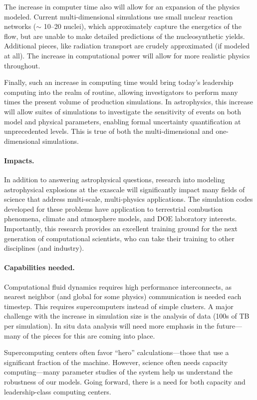 \documentclass[11pt,twocolumn]{article}
\begin{document}
The increase in computer time also will allow for an expansion of the
physics modeled.  Current multi-dimensional simulations use small
nuclear reaction networks ($\sim$ 10--20 nuclei), which approximately
capture the energetics of the flow, but are unable to make detailed
predictions of the nucleosynthetic yields.  Additional pieces, like
radiation transport are crudely approximated (if modeled at all).  The
increase in computational power will allow for more realistic physics
throughout.

Finally, such an increase in computing time would bring today's
leadership computing into the realm of routine, allowing investigators
to perform many times the present volume of production simulations.
In astrophysics, this increase will allow suites of simulations to
investigate the sensitivity of events on both model and physical
parameters, enabling formal uncertainty quantification at
unprecedented levels.  This is true of both the multi-dimensional and
one-dimensional simulations.

\paragraph*{Impacts.}
In addition to answering astrophysical questions, research into
modeling astrophysical explosions at the exascale will significantly
impact many fields of science that address multi-scale, multi-physics
applications.  The simulation codes developed for these problems have
application to terrestrial combustion phenomena, climate and
atmosphere models, and DOE laboratory interests.  Importantly, this
research provides an excellent training ground for the next generation
of computational scientists, who can take their training to other
disciplines (and industry).


\paragraph*{Capabilities needed.}  Computational fluid dynamics requires
high performance interconnects, as nearest neighbor (and global for
some physics) communication is needed each timestep.  This requires
supercomputers instead of simple clusters.  A major challenge with the
increase in simulation size is the analysis of data (100s of TB
per simulation).  In situ data analysis will need more emphasis in the
future---many of the pieces for this are coming into place.

Supercomputing centers often favor ``hero'' calculations---those that
use a significant fraction of the machine.
However, science often needs capacity computing---many parameter
studies of the system help us understand the robustness of our models.
Going forward, there is a need for both capacity and leadership-class
computing centers.
\end{document}
